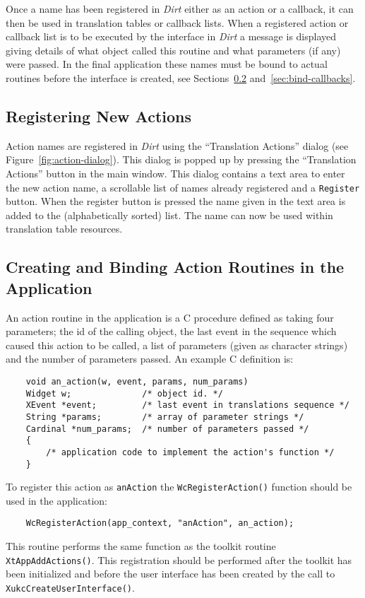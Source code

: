 Once a name has been registered in {\em Dirt} either as an action or a
callback, it can then be used in translation tables or callback lists.  When a
registered action or callback list is to be executed by the interface in
{\em Dirt} a message is displayed giving details of what object called this
routine and what parameters (if any) were passed.  In the final application
these names must be bound to actual routines before the interface is
created, see Sections~\ref{sec:bind-actions} and~\ref{sec:bind-callbacks}.

\subsection{Registering New Actions}
\label{sec:register-actions}
Action names are registered in {\em Dirt} using the ``Translation Actions''
dialog (see Figure~\ref{fig:action-dialog}).  This dialog is popped up by
pressing the ``Translation Actions''
button in the main window.  This dialog contains a text area to enter the new
action name, a scrollable list of names already registered and a
{\tt Register} button. When the register button is pressed the name given in
the text area is added to the (alphabetically sorted) list.  The name can now
be used within translation table resources.

\subsection{Creating and Binding Action Routines in the Application}
\label{sec:bind-actions}
An action routine in the application is a C procedure defined as taking four
parameters; the id of the calling object, the last event in the sequence
which caused this action to be called, a list of parameters (given as
character strings) and the number of parameters passed.  An example C
definition is:\begin{verbatim}
    void an_action(w, event, params, num_params)
    Widget w;              /* object id. */
    XEvent *event;         /* last event in translations sequence */
    String *params;        /* array of parameter strings */
    Cardinal *num_params;  /* number of parameters passed */
    {
        /* application code to implement the action's function */
    }
\end{verbatim}
To register this action as {\tt anAction} the {\tt WcRegisterAction()}
function should be used in the application:\begin{verbatim}
    WcRegisterAction(app_context, "anAction", an_action);
\end{verbatim}
This routine performs the same function as the toolkit routine
{\tt XtAppAddActions()}.
This registration should be performed after the toolkit has been initialized
and before the user interface has been created by the call to
{\tt XukcCreateUserInterface()}.


